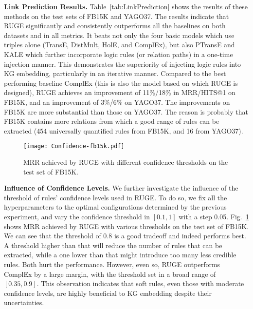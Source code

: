 \documentclass[letterpaper]{article} \usepackage{aaai18}  \usepackage{times}  \usepackage{helvet}  \usepackage{courier}  \usepackage{url}  \usepackage{graphicx}  \usepackage{amsmath}
\begin{document}
\smallskip
\noindent\textbf{Link Prediction Results.} Table~\ref{tab:LinkPrediction} shows the results of these methods on the test sets of FB15K and YAGO37. The results indicate that RUGE significantly and consistently outperforms all the baselines on both datasets and in all metrics. It beats not only the four basic models which use triples alone (TransE, DistMult, HolE, and ComplEx), but also PTransE and KALE which further incorporate logic rules (or relation paths) in a one-time injection manner. This demonstrates the superiority of injecting logic rules into KG embedding, particularly in an iterative manner. Compared to the best performing baseline ComplEx (this is also the model based on which RUGE is designed), RUGE achieves an improvement of 11\%/18\% in MRR/HITS@1 on FB15K, and an improvement of 3\%/6\% on YAGO37. The improvements on FB15K are more substantial than those on YAGO37. The reason is probably that FB15K contains more relations from which a good range of rules can be extracted (454 universally quantified rules from FB15K, and 16 from YAGO37).

\begin{figure}[t]
    \centering
    \label{fig:Confidence-FB15K}
        \texttt{[image: Confidence-fb15k.pdf]}
  \caption{MRR achieved by RUGE with different confidence thresholds on the test set of FB15K.}\label{fig:Confidence}
\end{figure}

\smallskip
\noindent\textbf{Influence of Confidence Levels.} We further investigate the influence of the threshold of rules' confidence levels used in RUGE. To do so, we fix all the hyperparameters to the optimal configurations determined by the previous experiment, and vary the confidence threshold in $[0.1,1]$ with a step 0.05. Fig.~\ref{fig:Confidence} shows MRR achieved by RUGE with various thresholds on the test set of FB15K. We can see that the threshold of 0.8 is a good tradeoff and indeed performs best. A threshold higher than that will reduce the number of rules that can be extracted, while a one lower than that might introduce too many less credible rules. Both hurt the performance. However, even so, RUGE outperforms ComplEx by a large margin, with the threshold set in a broad range of $[0.35, 0.9]$. This observation indicates that soft rules, even those with moderate confidence levels, are highly beneficial to KG embedding despite their uncertainties. 
\end{document}
